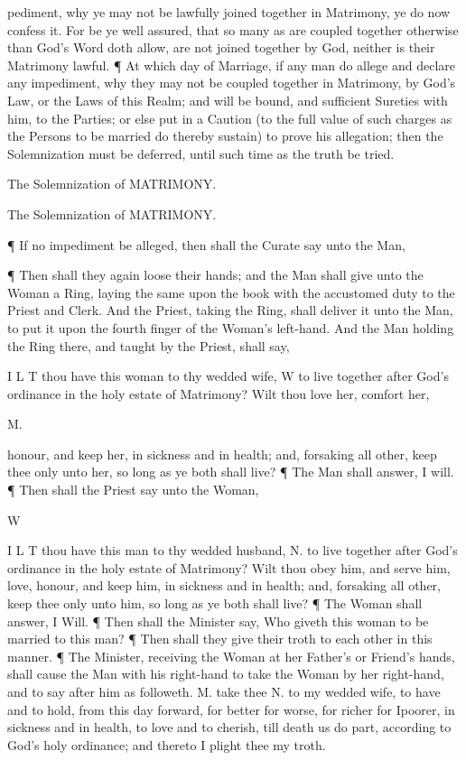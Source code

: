 pediment, why ye may not be lawfully joined together in Matrimony, ye do now confess it. For be ye well assured, that so many as are coupled together otherwise than God’s Word doth allow, are not joined together by God, neither is their Matrimony lawful. ¶ At which day of Marriage, if any man do allege and declare any impediment, why they may not be coupled together in Matrimony, by God’s Law, or the Laws of this Realm; and will be bound, and sufficient Sureties with him, to the Parties; or else put in a Caution (to the full value of such charges as the Persons to be married do thereby sustain) to prove his allegation; then the Solemnization must be deferred, until such time as the truth be tried.

The Solemnization of MATRIMONY.

The Solemnization of MATRIMONY.

¶ If no impediment be alleged, then shall the Curate say unto the Man,

¶ Then shall they again loose their hands; and the Man shall give unto the Woman a Ring, laying the same upon the book with the accustomed duty to the Priest and Clerk. And the Priest, taking the Ring, shall deliver it unto the Man, to put it upon the fourth finger of the Woman’s left-hand. And the Man holding the Ring there, and taught by the Priest, shall say,

I L T thou have this woman to thy wedded wife, W to live together after God’s ordinance in the holy estate of Matrimony? Wilt thou love her, comfort her,

M.

honour, and keep her, in sickness and in health; and, forsaking all other, keep thee only unto her, so long as ye both shall live? ¶ The Man shall answer, I will. ¶ Then shall the Priest say unto the Woman,

W

I L T thou have this man to thy wedded husband, N. to live together after God’s ordinance in the holy estate of Matrimony? Wilt thou obey him, and serve him, love, honour, and keep him, in sickness and in health; and, forsaking all other, keep thee only unto him, so long as ye both shall live? ¶ The Woman shall answer, I Will. ¶ Then shall the Minister say, Who giveth this woman to be married to this man? ¶ Then shall they give their troth to each other in this manner. ¶ The Minister, receiving the Woman at her Father’s or Friend’s hands, shall cause the Man with his right-hand to take the Woman by her right-hand, and to say after him as followeth. M. take thee N. to my wedded wife, to have and to hold, from this day forward, for better for worse, for richer for Ipoorer, in sickness and in health, to love and to cherish, till death us do part, according to God’s holy ordinance; and thereto I plight thee my troth.

